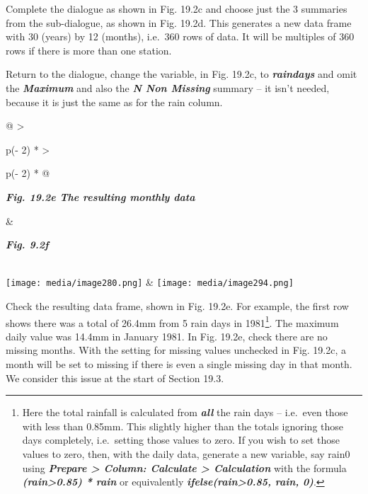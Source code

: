 \documentclass[
  letterpaper,
  DIV=11,
  numbers=noendperiod]{scrreprt}
\begin{document}
Complete the dialogue as shown in Fig. 19.2c and choose just the 3
summaries from the sub-dialogue, as shown in Fig. 19.2d. This generates
a new data frame with 30 (years) by 12 (months), i.e.~360 rows of data.
It will be multiples of 360 rows if there is more than one station.

Return to the dialogue, change the variable, in Fig. 19.2c, to
\textbf{\emph{raindays}} and omit the \textbf{\emph{Maximum}} and also
the \textbf{\emph{N Non Missing}} summary -- it isn't needed, because it
is just the same as for the rain column.

\begin{longtable}[]{@{}
  >{\raggedright\arraybackslash}p{(\columnwidth - 2\tabcolsep) * }
  >{\raggedright\arraybackslash}p{(\columnwidth - 2\tabcolsep) * }@{}}
\toprule\noalign{}
\begin{minipage}[b]{\linewidth}\raggedright
\textbf{\emph{Fig. 19.2e The resulting monthly data}}
\end{minipage} & \begin{minipage}[b]{\linewidth}\raggedright
\textbf{\emph{Fig. 9.2f}}
\end{minipage} \\
\midrule\noalign{}
\endhead
\bottomrule\noalign{}
\endlastfoot
\texttt{[image: media/image280.png]} &
\texttt{[image: media/image294.png]} \\
\end{longtable}

Check the resulting data frame, shown in Fig. 19.2e. For example, the
first row shows there was a total of 26.4mm from 5 rain days in
1981\footnote{Here the total rainfall is calculated from
  \textbf{\emph{all}} the rain days -- i.e.~even those with less than
  0.85mm. This slightly higher than the totals ignoring those days
  completely, i.e.~setting those values to zero. If you wish to set
  those values to zero, then, with the daily data, generate a new
  variable, say rain0 using \textbf{\emph{Prepare \textgreater{} Column:
  Calculate \textgreater{} Calculation}} with the formula
  \textbf{\emph{(rain\textgreater0.85) * rain}} or equivalently
  \textbf{\emph{ifelse(rain\textgreater0.85, rain, 0)}}.}. The maximum
daily value was 14.4mm in January 1981. In Fig. 19.2e, check there are
no missing months. With the setting for missing values unchecked in Fig.
19.2c, a month will be set to missing if there is even a single missing
day in that month. We consider this issue at the start of Section 19.3.
\end{document}
